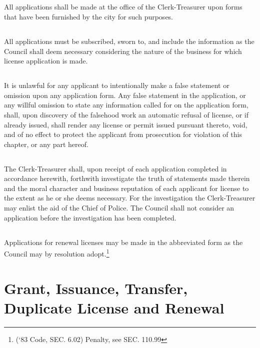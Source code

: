 \subsection{}
All applications shall be made at the office of the Clerk-Treasurer upon forms that have been furnished by the city for such purposes.
\subsection{}
All applications must be subscribed, sworn to, and include the information as the Council shall deem necessary considering the nature of the business for which license application is made.
\subsection{}
It is unlawful for any applicant to intentionally make a false statement or omission upon any application form.  Any false statement in the application, or any willful omission to state any information called for on the application form, shall, upon discovery of the falsehood work an automatic refusal of license, or if already issued, shall render any license or permit issued pursuant thereto, void, and of no effect to protect the applicant from prosecution for violation of this chapter, or any part hereof.
\subsection{}
The Clerk-Treasurer shall, upon receipt of each application completed in accordance herewith, forthwith investigate the truth of statements made therein and the moral character and business reputation of each applicant for license to the extent as he or she deems necessary.  For the investigation the Clerk-Treasurer may enlist the aid of the Chief of Police.  The Council shall not consider an application before the investigation has been completed.
\subsection{}
Applications for renewal licenses may be made in the abbreviated form as the Council may by resolution adopt.\footnote{(‘83 Code, SEC. 6.02)  Penalty, see SEC. 110.99}

\section{Grant, Issuance, Transfer, Duplicate License and Renewal}
